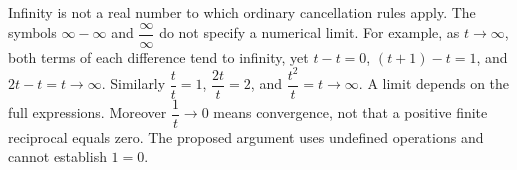 Infinity is not a real number to which ordinary cancellation rules apply. The symbols $\infty-\infty$ and $\dfrac{\infty}{\infty}$ do not specify a numerical limit. For example, as $t\to\infty$, both terms of each difference tend to infinity, yet $t-t=0$, $(t+1)-t=1$, and $2t-t=t\to\infty$. Similarly $\dfrac{t}{t}=1$, $\dfrac{2t}{t}=2$, and $\dfrac{t^2}{t}=t\to\infty$. A limit depends on the full expressions. Moreover $\dfrac{1}{t}\to0$ means convergence, not that a positive finite reciprocal equals zero. The proposed argument uses undefined operations and cannot establish $1=0$.
